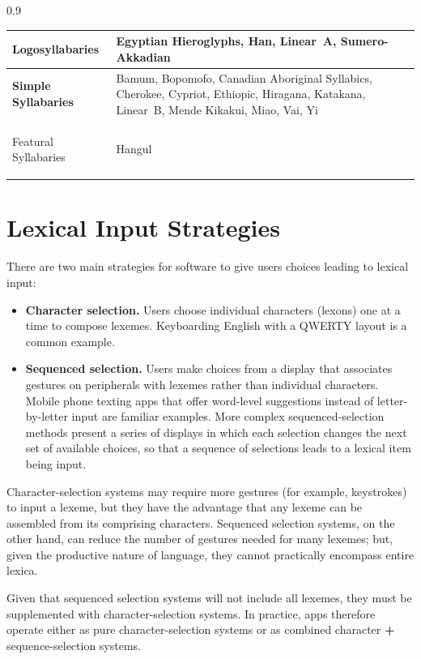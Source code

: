 \begin{table}[H]
\begin{spacing}{0.9}
\begin{tabularx}{\textwidth}{|
				>{\raggedright\arraybackslash\bfseries}m{}|
				>{\raggedright\arraybackslash}X|
			}
			Logosyllabaries &
			Egyptian Hieroglyphs, Han, Linear~A, Sumero-Akkadian \\ \hline

			Simple Syllabaries &
			Bamum, Bopomofo, Canadian Aboriginal Syllabics, Cherokee, Cypriot,
			Ethiopic, Hiragana, Katakana, Linear~B, Mende Kikakui, Miao, Vai,
			Yi \\ \hline

			Featural Syllabaries &
			Hangul \\ \hline

		\end{tabularx}
	\end{spacing}
	\endgroup

\end{table}

\section{Lexical Input Strategies}\label{lexical-input-strategies}

There are two main strategies for software to give users choices leading
to lexical input:

\begin{itemize}
	\item \textbf{Character selection.} Users choose individual
	characters (lexons) one at a time to compose lexemes.
	Keyboarding English with a QWERTY layout is a common example.

	\item \textbf{Sequenced selection.} Users make choices from a display
	that associates gestures on peripherals with lexemes rather than
	individual characters. Mobile phone texting apps that offer
	word-level suggestions instead of letter-by-letter input are
	familiar examples. More complex sequenced-selection methods
	present a series of displays in which each selection changes the
	next set of available choices, so that a sequence of selections
	leads to a lexical item being input.
\end{itemize}

Character-selection systems may require more gestures (for example,
keystrokes) to input a lexeme, but they have the advantage that any
lexeme can be assembled from its comprising characters. Sequenced
selection systems, on the other hand, can reduce the number of gestures
needed for many lexemes; but, given the productive nature of language,
they cannot practically encompass entire lexica.

Given that sequenced selection systems will not include all lexemes,
they must be supplemented with character-selection systems. In practice,
\mulex{} apps therefore operate either as pure character-selection
systems or as combined character \textbf{+} sequence-selection systems.

